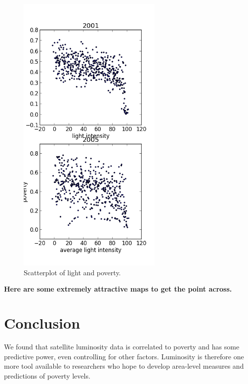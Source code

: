 \documentclass{article}
\begin{document}
\begin{figure}
\begin{center}
\includegraphics[width=7cm]{dotplot.png}

\end{center}
\caption{Scatterplot of light and poverty.}
\end{figure}

{\bf Here are some extremely attractive maps to get the point across.}

\section{Conclusion} We found that satellite luminosity data is correlated to poverty and
has some predictive power, even controlling for other factors. 
Luminosity is therefore one more tool available to researchers who hope to develop area-level
measures and predictions of poverty levels.



\end{document}
